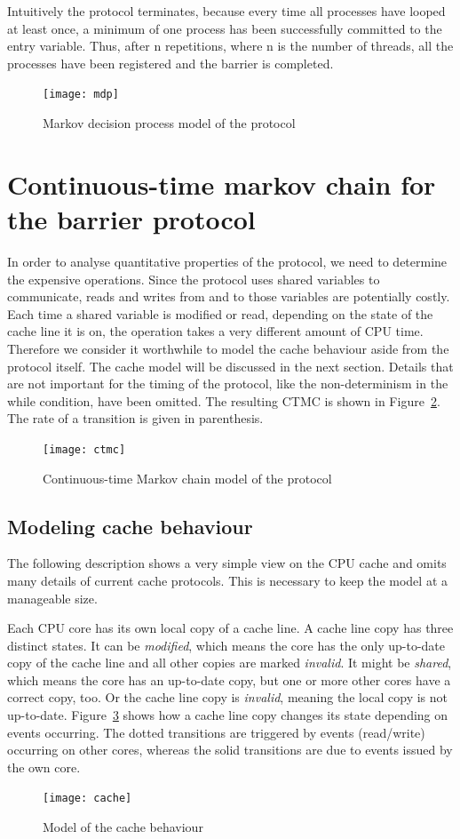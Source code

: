 \documentclass[a4paper, 10pt]{article}
\begin{document}
Intuitively the protocol terminates, because every time all processes have looped at least once, a minimum of one process has been successfully committed to the entry variable. Thus, after n repetitions, where n is the number of threads, all the processes have been registered and the barrier is completed.

\begin{figure}[htbp]
	\centering
	\texttt{[image: mdp]}
	\caption{Markov decision process model of the protocol}
	\label{fig:mdp}
\end{figure}

\clearpage

\section{Continuous-time markov chain for the barrier protocol}
In order to analyse quantitative properties of the protocol, we need to determine the expensive operations. Since the protocol uses shared variables to communicate, reads and writes from and to those variables are potentially costly. Each time a shared variable is modified or read, depending on the state of the cache line it is on, the operation takes a very different amount of CPU time. Therefore we consider it worthwhile to model the cache behaviour aside from the protocol itself. The cache model will be discussed in the next section. Details that are not important for the timing of the protocol, like the non-determinism in the while condition, have been omitted. The resulting CTMC is shown in Figure~\ref{fig:ctmc}. The rate of a transition is given in parenthesis.
\begin{figure}[htbp]
	\centering
	\texttt{[image: ctmc]}
	\caption{Continuous-time Markov chain model of the protocol}
	\label{fig:ctmc}
\end{figure}
\subsection{Modeling cache behaviour}
The following description shows a very simple view on the CPU cache and omits many details of current cache protocols. This is necessary to keep the model at a manageable size.

Each CPU core has its own local copy of a cache line. A cache line copy has three distinct states. It can be \emph{modified}, which means the core has the only up-to-date copy of the cache line and all other copies are marked \emph{invalid}. It might be \emph{shared}, which means the core has an up-to-date copy, but one or more other cores have a correct copy, too. Or the cache line copy is \emph{invalid}, meaning the local copy is not up-to-date. Figure~\ref{fig:cache} shows how a cache line copy changes its state depending on events occurring. The dotted transitions are triggered by events (read/write) occurring on other cores, whereas the solid transitions are due to events issued by the own core.
\begin{figure}[htbp]
	\centering
	\texttt{[image: cache]}
	\caption{Model of the cache behaviour}
	\label{fig:cache}
\end{figure}
\end{document}
